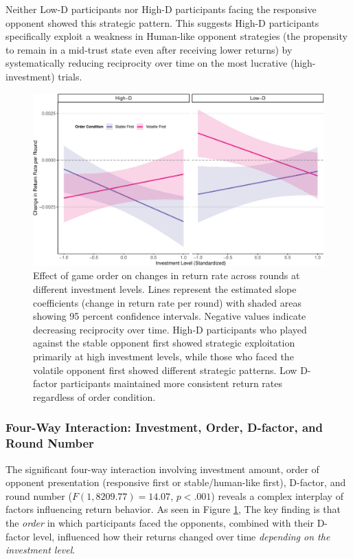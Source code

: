 \documentclass[
]{article}
\begin{document}
Neither Low-D participants nor High-D participants facing the responsive opponent showed this strategic pattern. This suggests High-D participants specifically exploit a weakness in Human-like opponent strategies (the propensity to remain in a mid-trust state even after receiving lower returns) by systematically reducing reciprocity over time on the most lucrative (high-investment) trials.

\begin{figure}[H]

{\centering \includegraphics[width=\textwidth]{article_files/figure-latex/orderEffectPlot-1} 

}

\caption{Effect of game order on changes in return rate across rounds at different investment levels. Lines represent the estimated slope coefficients (change in return rate per round) with shaded areas showing 95 percent confidence intervals. Negative values indicate decreasing reciprocity over time. High-D participants who played against the stable opponent first showed strategic exploitation primarily at high investment levels, while those who faced the volatile opponent first showed different strategic patterns. Low D-factor participants maintained more consistent return rates regardless of order condition.}\label{fig:orderEffectPlot}
\end{figure}

\subsubsection{Four-Way Interaction: Investment, Order, D-factor, and Round Number}\label{four-way-interaction-investment-order-d-factor-and-round-number}

The significant four-way interaction involving investment amount, order of opponent presentation (responsive first or stable/human-like first), D-factor, and round number (\(F(1, 8209.77) = 14.07\), \(p < .001\)) reveals a complex interplay of factors influencing return behavior. As seen in Figure \ref{fig:orderEffectPlot}, The key finding is that the \emph{order} in which participants faced the opponents, combined with their D-factor level, influenced how their returns changed over time \emph{depending on the investment level}.
\end{document}

